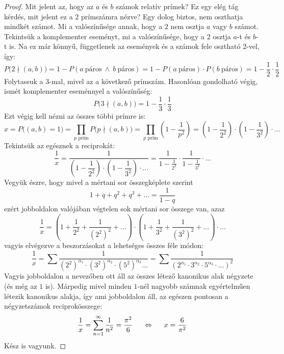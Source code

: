 \documentclass[12pt]{book}
\theoremstyle{plain} %
\theoremstyle{definition} %
\theoremstyle{remark}
\numberwithin{equation}{section}  %
\begin{document}
	\begin{proof}
		Mit jelent az, hogy az $a$ és $b$ számok relatív prímek? Ez egy elég tág kérdés, mit jelent ez a $2$ prímszámra nézve? Egy dolog biztos, nem oszthatja mindkét számot. Mi a valószínűsége annak, hogy a $2$ nem osztja $a$ vagy $b$ számot. Tekintsük a komplementer eseményt, mi a valószínűsége, hogy a $2$ osztja $a$-t és $b$-t is. Na ez már könnyű, függetlenek az események és a számok fele osztható $2$-vel, így:
		\[ P\Big( 2\nmid (a,b)\Big) = 1 - P( a\ \text{páros}\ \wedge\ b\ \text{páros}  ) = 1 - P( a\ \text{páros} ) \cdot P( b\ \text{páros} ) = 1 - \dfrac{1}{2} \cdot \dfrac{1}{2}  \]
		Folytassuk a $3$-mal, mivel az a következő prímszám. Hasonlóan gondolható végig, ismét komplementer eseménnyel a valószínűség:
		\[ P\Big(3\nmid (a,b)\Big) = 1 - \dfrac{1}{3} \cdot \dfrac{1}{3} \]
		Ezt végig kell nézni az összes többi prímre is:
		\[ x = P\Big( (a,b) = 1   \Big) = \prod_{p \text{ prím}} P\Big( p\nmid (a,b) \Big) = \prod_{p \text{ prím}} \left( 1- \dfrac{1}{p^2}   \right) = \left( 1 - \dfrac{1}{2^2}  \right) \cdot \left( 1 - \dfrac{1}{3^2}  \right) \cdot \ldots  \]
		Tekintsük az egésznek a reciprokát:
		\[ \dfrac{1}{x} = \dfrac{1}{\left( 1 - \dfrac{1}{2^2}  \right) \cdot \left( 1 - \dfrac{1}{3^2}  \right) \cdot \ldots} = \dfrac{1}{1-\frac{1}{2^2}} \cdot \dfrac{1}{1-\frac{1}{3^2}} \cdot \ldots  \]
		Vegyük észre, hogy mivel a mértani sor összegképlete szerint
		\[ 1+q+q^2+q^3+\ldots = \dfrac{1}{1-q}  \]
		ezért jobboldalon valójában végtelen sok mértani sor összege van, azaz
		\[ \dfrac{1}{x} = \left(1+\dfrac{1}{2^2} + \dfrac{1}{(2^2)^2} + \ldots \right)\cdot \left(1+\dfrac{1}{3^2}+\dfrac{1}{(3^2)^2}+\ldots\right)\cdot \ldots  \]
		vagyis elvégezve a beszorzásokat a lehetséges összes féle módon:
		\[ \dfrac{1}{x} = \sum \dfrac{1}{(2^2)^ {\alpha_1}\cdot (3^2)^{\alpha_2} \cdot (5^2)^{\alpha_3} \ldots } = \sum \dfrac{1}{(2^{\alpha_1}\cdot 3^{\alpha_2}\cdot 5^{\alpha_3} \cdot \ldots)^2}  \]
		Vagyis jobboldalon a nevezőben ott áll az összes létező kanonikus alak négyzete (és még az $1$ is). Márpedig mivel minden $1$-nél nagyobb számnak egyértelműen létezik kanonikus alakja, így ami jobboldalon áll, az egészen pontosan a négyzetszámok reciprokösszege:
		\[ \dfrac{1}{x} = \sum\limits_{n=1}^{\infty} \dfrac{1}{n^2} = \dfrac{\pi^2}{6} \hspace{5mm} \Leftrightarrow \hspace{5mm} x = \dfrac{6}{\pi^2}  \]
		Kész is vagyunk.
	\end{proof}
	
	
\end{document}
